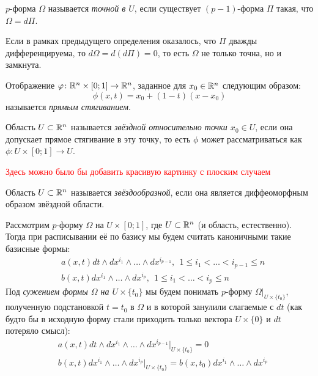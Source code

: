 \begin{definition}
	$p$-форма $\Omega$ называется \textit{точной в $U$}, если существует $(p - 1)$-форма $\Pi$ такая, что $\Omega = d\Pi$.
\end{definition}

\begin{note}
	Если в рамках предыдущего определения оказалось, что $\Pi$ дважды дифференцируема, то $d\Omega = d(d\Pi) = 0$, то есть $\Omega$ не только точна, но и замкнута.
\end{note}

\begin{definition}
	Отображение $\varphi \colon \mathbb{R}^n \times [0; 1] \to \mathbb{R}^n$, заданное для $x_0 \in \mathbb{R}^n$ следующим образом:
	\[
		\phi(x, t) = x_0 + (1 - t)(x - x_0)
	\]
	называется \textit{прямым стягиванием}.
\end{definition}

\begin{definition}
	Область $U \subset \mathbb{R}^n$ называется \textit{звёздной относительно точки $x_0 \in U$}, если она допускает прямое стягивание в эту точку, то есть $\phi$ может рассматриваться как $\phi \colon U \times [0; 1] \to U$.
\end{definition}

\textcolor{red}{Здесь можно было бы добавить красивую картинку с плоским случаем}

\begin{definition}
	Область $U \subset \mathbb{R}^n$ называется \textit{звёздообразной}, если она является диффеоморфным образом звёздной области.
\end{definition}

\begin{note}
	Рассмотрим $p$-форму $\Omega$ на $U \times [0; 1]$, где $U \subset \mathbb{R}^n$ (и область, естественно). Тогда при расписывании её по базису мы будем считать каноничными такие базисные формы:
	\begin{align*}
		&{a(x, t)dt \wedge dx^{i_1} \wedge \ldots \wedge dx^{i_{p - 1}},\ \ 1 \le i_1 < \ldots < i_{p - 1} \le n}
		\\
		&{b(x, t)dx^{i_1} \wedge \ldots \wedge dx^{i_p},\ \ 1 \le i_1 < \ldots < i_p \le n}
	\end{align*}
	Под \textit{сужением формы $\Omega$ на $U \times \{t_0\}$} мы будем понимать $p$-форму $\Omega|_{U \times \{t_0\}}$, полученную подстановкой $t = t_0$ в $\Omega$ и в которой занулили слагаемые с $dt$ (как будто бы в исходную форму стали приходить только вектора $U \times \{0\}$ и $dt$ потеряло смысл):
	\begin{align*}
		&{a(x, t)dt \wedge dx^{i_1} \wedge \ldots \wedge dx^{i_{p - 1}}|_{U \times \{t_0\}} = 0}
		\\
		&{b(x, t)dx^{i_1} \wedge \ldots \wedge dx^{i_p}|_{U \times \{t_0\}} = b(x, t_0)dx^{i_1} \wedge \ldots \wedge dx^{i_p}}
	\end{align*}
\end{note}

